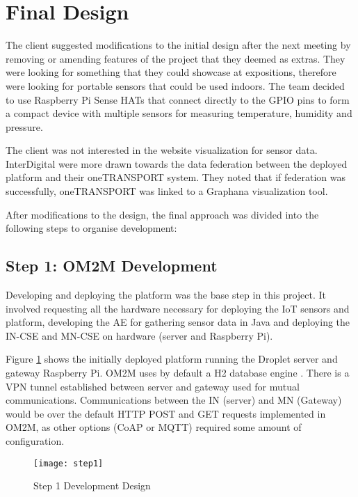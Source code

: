 \section{Final Design}

The client suggested modifications to the initial design after the next meeting by removing or amending features of the project that they deemed as extras. They were looking for something that they could showcase at expositions, therefore were looking for portable sensors that could be used indoors. The team decided to use Raspberry Pi Sense HATs that connect directly to the GPIO pins to form a compact device with multiple sensors for measuring temperature, humidity and pressure.

The client was not interested in the website visualization for sensor data. InterDigital were more drawn towards the data federation between the deployed platform and their oneTRANSPORT system. They noted that if federation was successfully, oneTRANSPORT was linked to a Graphana visualization tool.

After modifications to the design, the final approach was divided into the following steps to organise development:

\subsection{Step 1: OM2M Development}

Developing and deploying the platform was the base step in this project. It involved requesting all the hardware necessary for deploying the IoT sensors and platform, developing the AE for gathering sensor data in Java and deploying the IN-CSE and MN-CSE on hardware (server and Raspberry Pi).

Figure \ref{development-design} shows the initially deployed platform running the Droplet server and gateway Raspberry Pi. OM2M uses by default a H2 database engine \cite{H22017H2Engine}. There is a VPN tunnel established between server and gateway used for mutual communications. Communications between the IN (server) and MN (Gateway) would be over the default HTTP POST and GET requests implemented in OM2M, as other options (CoAP or MQTT) required some amount of configuration.

\begin{figure}[H]
  \centering
  \texttt{[image: step1]}
  \caption{Step 1 Development Design}
  \label{development-design}
\end{figure}

